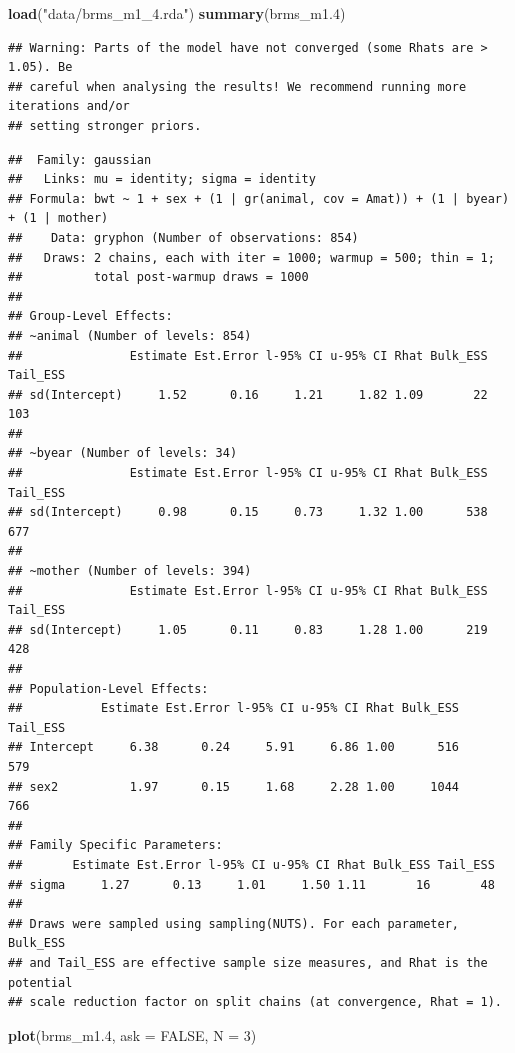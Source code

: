 \documentclass[
  12pt,
]{book}
\newenvironment{Shaded}{\begin{snugshade}}{\end{snugshade}}
\newcommand{\DataTypeTok}[1]{\textcolor[rgb]{0.13,0.29,0.53}{#1}}
\newcommand{\DecValTok}[1]{\textcolor[rgb]{0.00,0.00,0.81}{#1}}
\newcommand{\FloatTok}[1]{\textcolor[rgb]{0.00,0.00,0.81}{#1}}
\newcommand{\KeywordTok}[1]{\textcolor[rgb]{0.13,0.29,0.53}{\textbf{#1}}}
\newcommand{\NormalTok}[1]{#1}
\newcommand{\OtherTok}[1]{\textcolor[rgb]{0.56,0.35,0.01}{#1}}
\newcommand{\StringTok}[1]{\textcolor[rgb]{0.31,0.60,0.02}{#1}}
\begin{document}
\begin{Shaded}
\begin{Highlighting}[]
\KeywordTok{load}\NormalTok{(}\StringTok{"data/brms\_m1\_4.rda"}\NormalTok{)}
\KeywordTok{summary}\NormalTok{(brms\_m1}\FloatTok{.4}\NormalTok{)}
\end{Highlighting}
\end{Shaded}

\begin{verbatim}
## Warning: Parts of the model have not converged (some Rhats are > 1.05). Be
## careful when analysing the results! We recommend running more iterations and/or
## setting stronger priors.
\end{verbatim}

\begin{verbatim}
##  Family: gaussian 
##   Links: mu = identity; sigma = identity 
## Formula: bwt ~ 1 + sex + (1 | gr(animal, cov = Amat)) + (1 | byear) + (1 | mother) 
##    Data: gryphon (Number of observations: 854) 
##   Draws: 2 chains, each with iter = 1000; warmup = 500; thin = 1;
##          total post-warmup draws = 1000
## 
## Group-Level Effects: 
## ~animal (Number of levels: 854) 
##               Estimate Est.Error l-95% CI u-95% CI Rhat Bulk_ESS Tail_ESS
## sd(Intercept)     1.52      0.16     1.21     1.82 1.09       22      103
## 
## ~byear (Number of levels: 34) 
##               Estimate Est.Error l-95% CI u-95% CI Rhat Bulk_ESS Tail_ESS
## sd(Intercept)     0.98      0.15     0.73     1.32 1.00      538      677
## 
## ~mother (Number of levels: 394) 
##               Estimate Est.Error l-95% CI u-95% CI Rhat Bulk_ESS Tail_ESS
## sd(Intercept)     1.05      0.11     0.83     1.28 1.00      219      428
## 
## Population-Level Effects: 
##           Estimate Est.Error l-95% CI u-95% CI Rhat Bulk_ESS Tail_ESS
## Intercept     6.38      0.24     5.91     6.86 1.00      516      579
## sex2          1.97      0.15     1.68     2.28 1.00     1044      766
## 
## Family Specific Parameters: 
##       Estimate Est.Error l-95% CI u-95% CI Rhat Bulk_ESS Tail_ESS
## sigma     1.27      0.13     1.01     1.50 1.11       16       48
## 
## Draws were sampled using sampling(NUTS). For each parameter, Bulk_ESS
## and Tail_ESS are effective sample size measures, and Rhat is the potential
## scale reduction factor on split chains (at convergence, Rhat = 1).
\end{verbatim}

\begin{Shaded}
\begin{Highlighting}[]
\KeywordTok{plot}\NormalTok{(brms\_m1}\FloatTok{.4}\NormalTok{, }\DataTypeTok{ask =} \OtherTok{FALSE}\NormalTok{, }\DataTypeTok{N =} \DecValTok{3}\NormalTok{)}
\end{Highlighting}
\end{Shaded}
\end{document}
